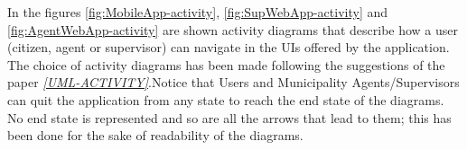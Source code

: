 \documentclass[a4paper]{report}
\begin{document}
In the figures \ref{fig:MobileApp-activity}, \ref{fig:SupWebApp-activity} and \ref{fig:AgentWebApp-activity} are shown activity diagrams that describe how a user (citizen, agent or supervisor) can navigate in the UIs offered by the application. The choice of activity diagrams has been made following the suggestions of the paper \label{use:UML-Activity} \hyperref[ref:UML-Activity]{\textit{[UML-ACTIVITY]}}.Notice that  Users and Municipality Agents/Supervisors can quit the application from any state to reach the end state of the diagrams. No end state is represented and so are all the arrows that lead to them; this has been done for the sake of readability of the diagrams.
\end{document}
